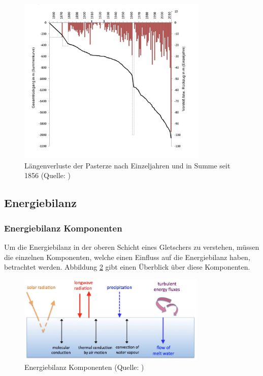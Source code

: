 \documentclass[11pt,a4paper]{article}
\begin{document}
\begin{figure}[H]
\centering
\includegraphics[width=0.81\textwidth]{pictures/pasterze_laengenaenderung.jpg}
\caption[Längenverluste der Pasterze nach Einzeljahren und in Summe seit 1856]{Längenverluste der Pasterze nach Einzeljahren und in Summe seit 1856  (Quelle:  \cite{LaengenaenderungPasterze})}
\label{fig:Längenverluste der Pasterze}
\end{figure}


\subsection{Energiebilanz}
\subsubsection{Energiebilanz Komponenten}\label{Energiebilanz Komponenten}
Um die Energiebilanz in der oberen Schicht eines Gletschers zu verstehen, müssen die einzelnen Komponenten, welche einen Einfluss auf die Energiebilanz haben, betrachtet werden. Abbildung \ref{fig:Energiebilanz Komponenten} gibt einen Überblick über diese Komponenten.

\begin{figure}[H]
\centering
\includegraphics[width=0.8\textwidth]{pictures/energy_balance_components.png}
\caption[Energiebilanz Komponenten]{Energiebilanz Komponenten (Quelle: \cite[17]{Themicroclimateofvalleyglaciers})}
\label{fig:Energiebilanz Komponenten}
\end{figure}
\end{document}
